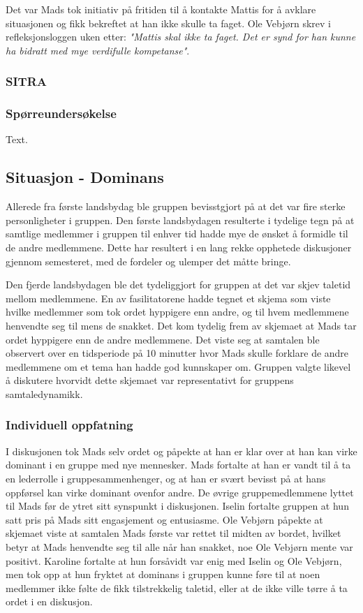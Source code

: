 Det var Mads tok initiativ på fritiden til å kontakte Mattis for å avklare situasjonen og fikk bekreftet at han ikke skulle ta faget. Ole Vebjørn skrev i refleksjonsloggen uken etter: \textit{"Mattis skal ikke ta faget. Det er synd for han kunne ha bidratt med mye verdifulle kompetanse"}. 

\subsubsection{SITRA}

\subsubsection{Spørreundersøkelse}

Text.

\subsection{Situasjon - Dominans} %
Allerede fra første landsbydag ble gruppen bevisstgjort på at det var fire sterke personligheter i gruppen. Den første landsbydagen resulterte i tydelige tegn på at samtlige medlemmer i gruppen til enhver tid hadde mye de ønsket å formidle til de andre medlemmene. Dette har resultert i en lang rekke opphetede diskusjoner gjennom semesteret, med de fordeler og ulemper det måtte bringe.  


Den fjerde landsbydagen ble det tydeliggjort for gruppen at det var skjev taletid mellom medlemmene. En av fasilitatorene hadde tegnet et skjema som viste hvilke medlemmer som tok ordet hyppigere enn andre, og til hvem medlemmene henvendte seg til mens de snakket. Det kom tydelig frem av skjemaet at Mads tar ordet hyppigere enn de andre medlemmene. Det viste seg at samtalen ble observert over en tidsperiode på 10 minutter hvor Mads skulle forklare de andre medlemmene om et tema han hadde god kunnskaper om. Gruppen valgte likevel å diskutere hvorvidt dette skjemaet var representativt for gruppens samtaledynamikk. 
\subsubsection{Individuell oppfatning}
I diskusjonen tok Mads selv ordet og påpekte at han er klar over at han kan virke dominant i en gruppe med nye mennesker. Mads fortalte at han er vandt til å ta en lederrolle i gruppesammenhenger, og at han er svært bevisst på at hans oppførsel kan virke dominant ovenfor andre. De øvrige gruppemedlemmene lyttet til Mads før de ytret sitt synspunkt i diskusjonen.
Iselin fortalte gruppen at hun satt pris på Mads sitt engasjement og entusiasme. Ole Vebjørn påpekte at skjemaet viste at samtalen Mads første var rettet til midten av bordet, hvilket betyr at Mads henvendte seg til alle når han snakket, noe Ole Vebjørn mente var positivt. Karoline fortalte at hun forsåvidt var enig med Iselin og Ole Vebjørn, men tok opp at hun fryktet at dominans i gruppen kunne føre til at noen medlemmer ikke følte de fikk tilstrekkelig taletid, eller at de ikke ville tørre å ta ordet i en diskusjon. 

